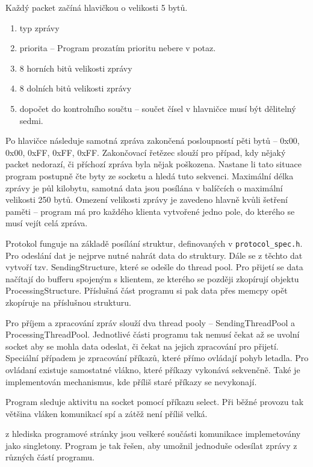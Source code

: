 \documentclass[a4paper,oneside,12pt]{report}
\begin{document}
Každý packet začíná hlavičkou o velikosti 5 bytů.

\begin{enumerate}
	\item typ zprávy
	\item priorita -- Program prozatím prioritu nebere v potaz.
	\item 8 horních bitů velikosti zprávy
	\item 8 dolních bitů velikosti zprávy
	\item dopočet do kontrolního součtu -- součet čísel v hlavničce musí být dělitelný sedmi.
\end{enumerate}

Po hlavičce následuje samotná zpráva zakončená posloupností pěti bytů -- 0x00, 0x00, 0xFF, 0xFF, 0xFF.
Zakončovací řetězec slouží pro případ, kdy nějaký packet nedorazí, či příchozí zpráva byla nějak poškozena.
Nastane li tato situace program postupně čte byty ze socketu a hledá tuto sekvenci.
Maximální délka zprávy je půl kilobytu, samotná data jsou posílána v balíčcích o maximální velikosti 250 bytů.
Omezení velikosti zprávy je zavedeno hlavně kvůli šetření paměti -- program má pro každého klienta vytvořené jedno pole, do kterého se musí vejít celá zpráva.

Protokol funguje na základě posílání struktur, definovaných v  \verb|protocol_spec.h|.
Pro odeslání dat je nejprve nutné nahrát data do struktury.
Dále se z těchto dat vytvoří tzv. SendingStructure, které se odešle do thread pool.
Pro přijetí se data načítají do bufferu spojeným s klientem, ze kterého se později zkopírují objektu ProcessingStructure.
Příslušná část programu si pak data přes memcpy opět zkopíruje na příslušnou strukturu.

Pro příjem a zpracování zpráv slouží dva thread pooly -- SendingThreadPool a ProcessingThreadPool.
Jednotlivé části programu tak nemusí čekat až se uvolní socket aby se mohla data odeslat, či čekat na jejich zpracování pro přijetí.
Speciální případem je zpracování příkazů, které přímo ovládají pohyb letadla.
Pro ovládaní existuje samostatné vlákno, které příkazy vykonává sekvenčně.
Také je implementován mechanismus, kde příliš staré příkazy se nevykonají.

Program sleduje aktivitu na socket pomocí příkazu select.
Při běžné provozu tak většina vláken komunikací spí a zátěž není příliš velká.

z hlediska programové stránky jsou veškeré součásti komunikace implemetovány jako singletony.
Program je tak řešen, aby umožnil jednoduše odesílat zprávy z různých částí programu.
\end{document}

